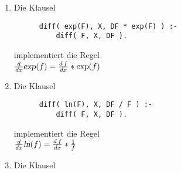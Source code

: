 \begin{enumerate}
      \begin{verbatim}
      diff( F ** N, X, N * DF * F ** N1 ) :-
          number(N),
          N1 is N - 1,
          diff( F, X, DF ).
      \end{verbatim}
      \vspace*{-0.7cm}

      implementiert die Regel \\[0.1cm]
      \hspace*{1.3cm} $\frac{d}{dx} f^n = n * \frac{d\, f}{dx} * f^{n-1}$ \\[0.1cm]
      Bei dieser Regel machen wir Gebrauch von dem zweistelligen Pr\"{a}dikat ``\texttt{is}'',
      das in Prolog eingebaut ist.  Dieses Pr\"{a}dikat darf in Prolog in Infix--Notation angegeben werden.
      Es hat die E/A--Spezifikationen \\[0.1cm]
      \hspace*{1.3cm} {\tt is(-, +)}. \\[0.1cm]
      Es erwartet als zweites Argument einen arithmetischen Ausdruck.  Es wertet diesen Ausdruck aus und gibt
      das Ergebnis im ersten Argument zur\"{u}ck.
\item Die Klausel
      \vspace*{-0.3cm}

      \begin{verbatim}
      diff( exp(F), X, DF * exp(F) ) :- 
          diff( F, X, DF ).
      \end{verbatim}
      \vspace*{-0.7cm}

      implementiert die Regel \\[0.1cm]
      \hspace*{1.3cm} $\frac{d}{dx}\textsl{exp}(f) = \frac{d\,f}{dx}* \textsl{exp}(f)$
\item Die Klausel
      \vspace*{-0.3cm}

      \begin{verbatim}
      diff( ln(F), X, DF / F ) :- 
          diff( F, X, DF ).
      \end{verbatim}
      \vspace*{-0.7cm}

      implementiert die Regel \\[0.1cm]
      \hspace*{1.3cm} $\frac{d}{dx}\textsl{ln}(f) = \frac{d\,f}{dx}* \frac{1}{f}$
\item Die Klausel
      \vspace*{-0.3cm}


\end{enumerate}
